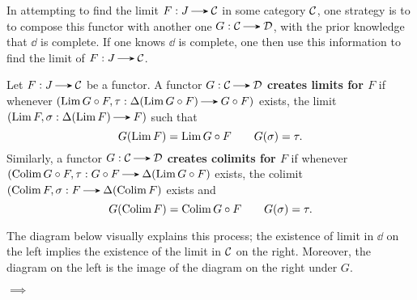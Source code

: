     In attempting to find the limit $F: J \to \cc$ in some category
    $\mathcal{C}$, one strategy is to to compose this functor with another one
    $G: \cc \to \dd$, with the prior knowledge that $\dd$ is complete.
    If one knows $\dd$ is complete, one then use this information to find 
    the limit of $F: J \to \cc$. 
    
    \begin{definition}
        Let $F: J \to \cc$ be a functor. A functor $G: \cc \to \dd$ 
        \textbf{creates limits for $F$} if whenever $(\Lim G \circ F, \tau: \Delta(\Lim G \circ F) \to G \circ F)$
        exists, 
        the limit $(\Lim F, \sigma: \Delta(\Lim F) \to F)$
        such that 
        \[
            G(\operatorname*{\mathrm{Lim }} F) = \operatorname*{\mathrm{Lim }} G \circ F \qquad G(\sigma) = \tau.
        \]
        Similarly, a functor $G: \cc \to \dd$ \textbf{creates colimits for $F$}
        if whenever $(\Colim G \circ F, \tau: G \circ F \to \Delta(\Lim G \circ F)$ 
        exists, the colimit $(\Colim F, \sigma: F \to \Delta(\Colim F)$ exists 
        and 
        \[
            G(\operatorname*{\mathrm{Colim }} F) = \operatorname*{\mathrm{Colim }} G \circ F \qquad G(\sigma) = \tau.
        \]
    \end{definition}

    The diagram below visually explains this process; the existence of limit 
    in $\dd$ on the left implies the existence of the limit in $\mathcal{C}$ on the right. 
    Moreover, the diagram on the left is the image of the diagram on the right 
    under $G$. 
    \begin{center}
        $\implies$
    \end{center}
    
